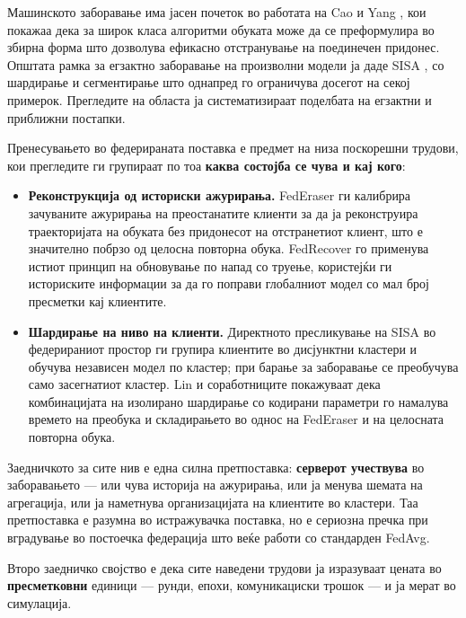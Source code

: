Машинското заборавање има јасен почеток во работата на Cao и Yang \cite{cao2015unlearning},
кои покажаа дека за широк класа алгоритми обуката може да се преформулира во збирна форма
што дозволува ефикасно отстранување на поединечен придонес. Општата рамка за егзактно
заборавање на произволни модели ја даде SISA \cite{bourtoule2021sisa}, со шардирање и
сегментирање што однапред го ограничува досегот на секој примерок. Прегледите на областа
\cite{nguyen2022musurvey} ја систематизираат поделбата на егзактни и приближни постапки.

Пренесувањето во федерираната поставка е предмет на низа поскорешни трудови, кои прегледите
\cite{liu2024fusurvey, romandini2024fusurvey} ги групираат по тоа \textbf{каква состојба се чува
и кај кого}:

\begin{itemize}
  \item \textbf{Реконструкција од историски ажурирања.} FedEraser \cite{liu2021federaser} ги
  калибрира зачуваните ажурирања на преостанатите клиенти за да ја реконструира траекторијата
  на обуката без придонесот на отстранетиот клиент, што е значително побрзо од целосна
  повторна обука. FedRecover \cite{cao2023fedrecover} го применува истиот принцип на
  обновување по напад со труење, користејќи ги историските информации за да го поправи
  глобалниот модел со мал број пресметки кај клиентите.
  \item \textbf{Шардирање на ниво на клиенти.} Директното пресликување на SISA во федерираниот
  простор ги групира клиентите во дисјунктни кластери и обучува независен модел по кластер;
  при барање за заборавање се преобучува само засегнатиот кластер. Lin и соработниците
  \cite{lin2024codedsharding} покажуваат дека комбинацијата на изолирано шардирање со
  кодирани параметри го намалува времето на преобука и складирањето во однос на FedEraser и
  на целосната повторна обука.
\end{itemize}

Заедничкото за сите нив е една силна претпоставка: \textbf{серверот учествува} во заборавањето ---
или чува историја на ажурирања, или ја менува шемата на агрегација, или ја наметнува
организацијата на клиентите во кластери. Таа претпоставка е разумна во истражувачка
поставка, но е сериозна пречка при вградување во постоечка федерација што веќе работи со
стандарден FedAvg.

Второ заедничко својство е дека сите наведени трудови ја изразуваат цената во
\textbf{пресметковни} единици --- рунди, епохи, комуникациски трошок --- и ја мерат во симулација.


